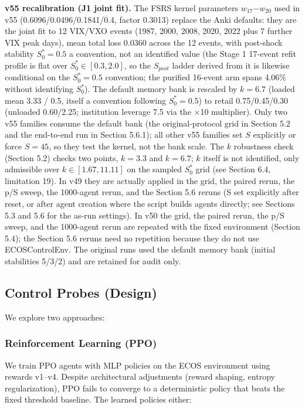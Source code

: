 \documentclass[11pt]{article}
\begin{document}
\textbf{v55 recalibration (J1 joint fit).} The FSRS kernel parameters $w_{17}$$-$$w_{20}$ used in v55 (0.6096/0.0496/0.1841/0.4, factor 0.3013) replace the Anki defaults: they are the joint fit to 12 VIX/VXO events (1987, 2000, 2008, 2020, 2022 plus 7 further VIX peak days), mean total loss 0.0360 across the 12 events, with post-shock stability $S_0^* = 0.5$ a convention, not an identified value (the Stage 1 17-event refit profile is flat over $S_0^* \in [0.3, 2.0]$, so the $S_{post}$ ladder derived from it is likewise conditional on the $S_0^* = 0.5$ convention; the purified 16-event arm spans 4.06\% without identifying $S_0^*$). The default memory bank is rescaled by $k = 6.7$ (loaded mean 3.33 / 0.5, itself a convention following $S_0^* = 0.5$) to retail 0.75/0.45/0.30 (unloaded 0.60/2.25; institution leverage 7.5 via the $\times$10 multiplier). Only two v55 families consume the default bank (the original-protocol grid in Section 5.2 and the end-to-end run in Section 5.6.1); all other v55 families set $S$ explicitly or force $S=45$, so they test the kernel, not the bank scale. The $k$ robustness check (Section 5.2) checks two points, $k = 3.3$ and $k = 6.7$; $k$ itself is not identified, only admissible over $k \in [1.67, 11.11]$ on the sampled $S_0^*$ grid (see Section 6.4, limitation 19). In v49 they are actually applied in the grid, the paired rerun, the p/S sweep, the 1000-agent rerun, and the Section 5.6 reruns (S set explicitly after reset, or after agent creation where the script builds agents directly; see Sections 5.3 and 5.6 for the as-run settings). In v50 the grid, the paired rerun, the p/S sweep, and the 1000-agent rerun are repeated with the fixed environment (Section 5.4); the Section 5.6 reruns need no repetition because they do not use ECOSControlEnv. The original runs used the default memory bank (initial stabilities 5/3/2) and are retained for audit only.

\subsection{Control Probes (Design)}
We explore two approaches:

\subsubsection{Reinforcement Learning (PPO)}
We train PPO agents with MLP policies on the ECOS environment using rewards v1--v4. Despite architectural adjustments (reward shaping, entropy regularization), PPO fails to converge to a deterministic policy that beats the fixed threshold baseline. The learned policies either:
\end{document}
